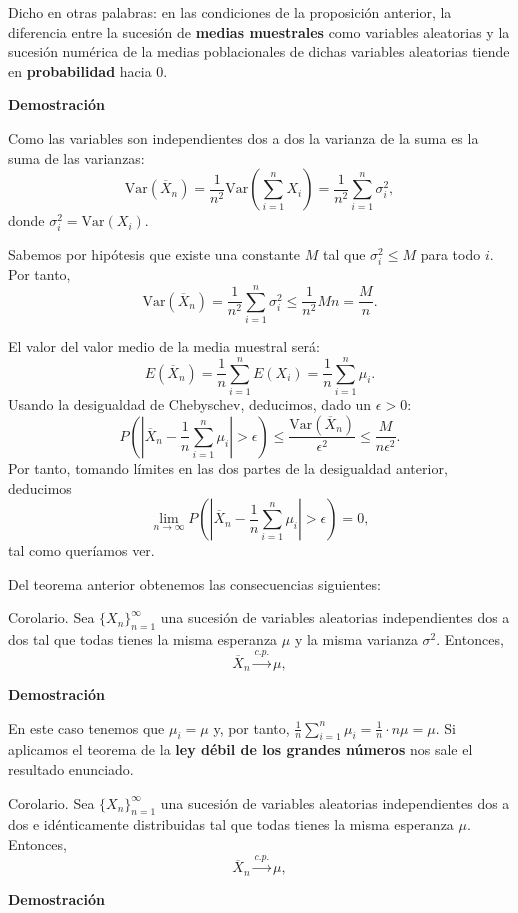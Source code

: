 \documentclass[]{book}
\begin{document}
Dicho en otras palabras: en las condiciones de la proposición anterior, la diferencia entre la sucesión de \textbf{medias muestrales} como variables aleatorias y la sucesión numérica de la medias poblacionales de dichas variables aleatorias tiende en \textbf{probabilidad} hacia 0.

\textbf{Demostración}

Como las variables son independientes dos a dos la varianza de la suma es la suma de las varianzas:
\[
\mathrm{Var}(\overline{X}_n)=\frac{1}{n^2}\mathrm{Var}(\sum_{i=1}^n X_i)=\frac{1}{n^2}\sum_{i=1}^n \sigma_i^2,
\]
donde \(\sigma_i^2 = \mathrm{Var}(X_i)\).

Sabemos por hipótesis que existe una constante \(M\) tal que \(\sigma_i^2\leq M\) para todo \(i\). Por tanto,
\[
\mathrm{Var}(\overline{X}_n)=\frac{1}{n^2}\sum_{i=1}^n \sigma_i^2\leq \frac{1}{n^2}Mn =\frac{M}{n}.
\]

El valor del valor medio de la media muestral será:
\[
E(\overline{X}_n)=\frac{1}{n}\sum_{i=1}^n E(X_i)=\frac{1}{n}\sum_{i=1}^n \mu_i. 
\]
Usando la desigualdad de Chebyschev, deducimos, dado un \(\epsilon >0\):
\[
P\left(\left|\overline{X}_n-\frac{1}{n}\sum_{i=1}^n \mu_i\right|>\epsilon\right) \leq \frac{\mathrm{Var}(\overline{X}_n)}{\epsilon^2}\leq \frac{M}{n\epsilon^2}.
\]
Por tanto, tomando límites en las dos partes de la desigualdad anterior, deducimos
\[
\lim_{n\to \infty}P\left(\left|\overline{X}_n-\frac{1}{n}\sum_{i=1}^n \mu_i\right|>\epsilon\right) =0,
\]
tal como queríamos ver.

Del teorema anterior obtenemos las consecuencias siguientes:

Corolario.
Sea \(\{X_n\}_{n=1}^\infty\) una sucesión de variables aleatorias independientes dos a dos tal que todas tienes la misma esperanza \(\mu\) y la misma varianza \(\sigma^2\). Entonces,
\[
\overline{X}_n\stackrel{c.p.}{\longrightarrow} \mu,
\]

\textbf{Demostración}

En este caso tenemos que \(\mu_i=\mu\) y, por tanto, \(\frac{1}{n}\sum\limits_{i=1}^n \mu_i =\frac{1}{n}\cdot n\mu=\mu\). Si aplicamos el teorema de la \textbf{ley débil de los grandes números} nos sale el resultado enunciado.

Corolario.
Sea \(\{X_n\}_{n=1}^\infty\) una sucesión de variables aleatorias independientes dos a dos e idénticamente distribuidas tal que todas tienes la misma esperanza \(\mu\). Entonces,
\[
\overline{X}_n\stackrel{c.p.}{\longrightarrow} \mu,
\]

\textbf{Demostración}
\end{document}
